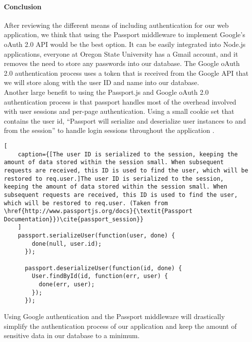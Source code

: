 \paragraph{Conclusion}
After reviewing the different means of including authentication for our web application, we think that using the Passport middleware to implement Google's oAuth 2.0 API would be the best option. It can be easily integrated into Node.js applications, everyone at Oregon State University has a Gmail account, and it removes the need to store any passwords into our database. The Google oAuth 2.0 authentication process uses a token that is received from the Google API that we will store along with the user ID and name into our database.\\
Another large benefit to using the Passport.js and Google oAuth 2.0 authentication process is that passport handles most of the overhead involved with user sessions and per-page authentication. Using a small cookie set that contains the user id, ``Passport will serialize and deserialize user instances to and from the session'' to handle login sessions throughout the application \cite{passport_session}.
\begin{lstlisting}[
    caption={[The user ID is serialized to the session, keeping the amount of data stored within the session small. When subsequent requests are received, this ID is used to find the user, which will be restored to req.user.]The user ID is serialized to the session, keeping the amount of data stored within the session small. When subsequent requests are received, this ID is used to find the user, which will be restored to req.user. (Taken from \href{http://www.passportjs.org/docs}{\textit{Passport Documentation}})\cite{passport_session}}
    ]
    passport.serializeUser(function(user, done) {
        done(null, user.id);
      });
      
      passport.deserializeUser(function(id, done) {
        User.findById(id, function(err, user) {
          done(err, user);
        });
      });
\end{lstlisting}

Using Google authentication and the Passport middleware will drastically simplify the authentication process of our application and keep the amount of sensitive data in our database to a minimum.
